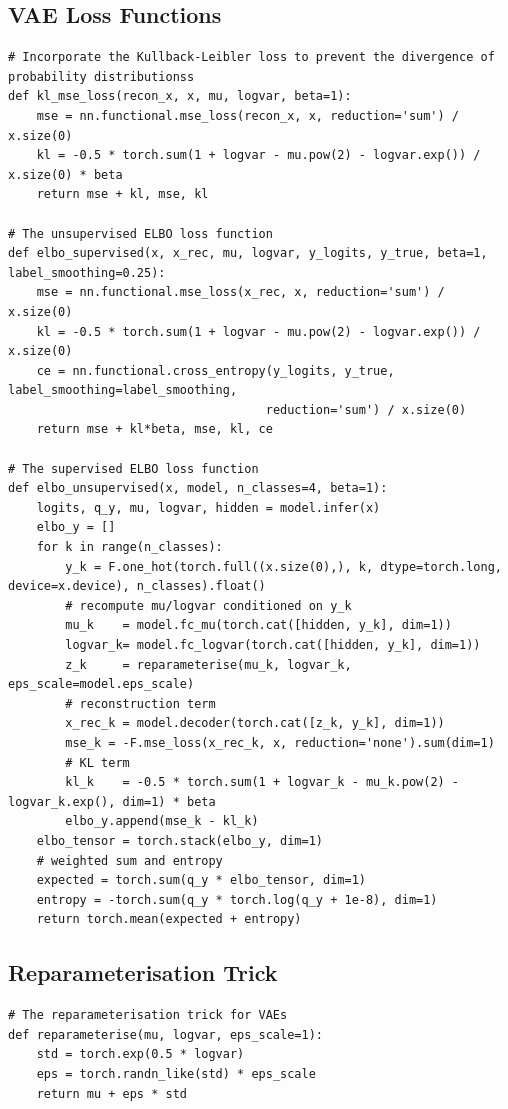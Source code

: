 \subsection{VAE Loss Functions}
\label{sec:code:ELBOs}
\begin{verbatim}
# Incorporate the Kullback-Leibler loss to prevent the divergence of probability distributionss
def kl_mse_loss(recon_x, x, mu, logvar, beta=1):
    mse = nn.functional.mse_loss(recon_x, x, reduction='sum') / x.size(0)
    kl = -0.5 * torch.sum(1 + logvar - mu.pow(2) - logvar.exp()) / x.size(0) * beta
    return mse + kl, mse, kl

# The unsupervised ELBO loss function
def elbo_supervised(x, x_rec, mu, logvar, y_logits, y_true, beta=1, label_smoothing=0.25):
    mse = nn.functional.mse_loss(x_rec, x, reduction='sum') / x.size(0)
    kl = -0.5 * torch.sum(1 + logvar - mu.pow(2) - logvar.exp()) / x.size(0)
    ce = nn.functional.cross_entropy(y_logits, y_true, label_smoothing=label_smoothing, 
                                    reduction='sum') / x.size(0)
    return mse + kl*beta, mse, kl, ce

# The supervised ELBO loss function
def elbo_unsupervised(x, model, n_classes=4, beta=1):
    logits, q_y, mu, logvar, hidden = model.infer(x)
    elbo_y = []
    for k in range(n_classes):
        y_k = F.one_hot(torch.full((x.size(0),), k, dtype=torch.long, device=x.device), n_classes).float()
        # recompute mu/logvar conditioned on y_k
        mu_k    = model.fc_mu(torch.cat([hidden, y_k], dim=1))
        logvar_k= model.fc_logvar(torch.cat([hidden, y_k], dim=1))
        z_k     = reparameterise(mu_k, logvar_k, eps_scale=model.eps_scale)
        # reconstruction term
        x_rec_k = model.decoder(torch.cat([z_k, y_k], dim=1))
        mse_k = -F.mse_loss(x_rec_k, x, reduction='none').sum(dim=1)
        # KL term
        kl_k    = -0.5 * torch.sum(1 + logvar_k - mu_k.pow(2) - logvar_k.exp(), dim=1) * beta
        elbo_y.append(mse_k - kl_k)
    elbo_tensor = torch.stack(elbo_y, dim=1)
    # weighted sum and entropy
    expected = torch.sum(q_y * elbo_tensor, dim=1)
    entropy = -torch.sum(q_y * torch.log(q_y + 1e-8), dim=1)
    return torch.mean(expected + entropy)
\end{verbatim}

\subsection{Reparameterisation Trick}
\label{sec:code:raparam}
\begin{verbatim}
# The reparameterisation trick for VAEs
def reparameterise(mu, logvar, eps_scale=1):
    std = torch.exp(0.5 * logvar)
    eps = torch.randn_like(std) * eps_scale
    return mu + eps * std
\end{verbatim}

